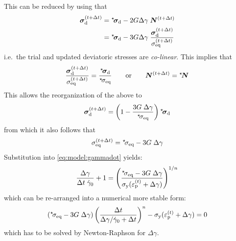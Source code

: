 \documentclass[times,namecite]{goose-article}
\newcommand\leftstar[1]{\hspace*{-.3em}~^\star\!#1}
\begin{document}
This can be reduced by using that
\begin{align}
  \bm{\sigma}_\mathrm{d}^{(t+\Delta t)}
  &= \leftstar{\bm{\sigma}}_\mathrm{d} - 2 G \Delta \gamma \; \bm{N}^{(t+\Delta t)}
  \\
  &= \leftstar{\bm{\sigma}}_\mathrm{d} - 3 G \Delta \gamma \;
   \frac{ \bm{\sigma}_\mathrm{d}^{(t+\Delta t)} }{ \sigma_\mathrm{eq}^{(t+\Delta t)} }
\end{align}
i.e.\ the trial and updated deviatoric stresses are \emph{co-linear}. This implies that
\begin{equation}
  \frac{ \bm{\sigma}_\mathrm{d}^{(t+\Delta t)} }{ \sigma_\mathrm{eq}^{(t+\Delta t)} }
  =
  \frac{ \leftstar{\bm{\sigma}}_\mathrm{d} }{ \leftstar{\sigma}_\mathrm{eq} }
  \qquad
  \mathrm{or}
  \qquad
  \bm{N}^{(t+\Delta t)} = \leftstar{\bm{N}}
\end{equation}
This allows the reorganization of the above to
\begin{equation}
  \bm{\sigma}_\mathrm{d}^{(t+\Delta t)}
  =
  \left(1 - \frac{ 3 G \; \Delta \gamma }{ \leftstar{\sigma}_\mathrm{eq} } \right)
  \leftstar{\bm{\sigma}}_\mathrm{d}
\end{equation}
from which it also follows that
\begin{equation}
  \sigma_\mathrm{eq}^{(t+\Delta t)} = \leftstar{\sigma}_\mathrm{eq} - 3 G \; \Delta \gamma
\end{equation}
Substitution into \eqref{eq:model:gammadot} yields:
\begin{equation}\label{eq:return:gammadot}
  \frac{ \Delta \gamma }{ \Delta t \; \dot{\gamma}_0 } + 1 =
  \left(
    \frac{
      \leftstar{\sigma}_\mathrm{eq} - 3 G \; \Delta \gamma
    }{
      \sigma_\mathrm{y}( \varepsilon_\mathrm{p}^{(t)} + \Delta \gamma )
    }
  \right)^{1/n}
\end{equation}
which can be re-arranged into a numerical more stable form:
\begin{equation}\label{eq:return:gammadot2}
  \left( \leftstar{\sigma}_\mathrm{eq} - 3 G \; \Delta \gamma \right)
  \left( \frac{\Delta t}{ \Delta \gamma / \dot{\gamma}_0 + \Delta t} \right)^n
  - \sigma_\mathrm{y}( \varepsilon_\mathrm{p}^{(t)} + \Delta \gamma ) = 0
\end{equation}
which has to be solved by Newton-Raphson for $\Delta \gamma$.
\end{document}
